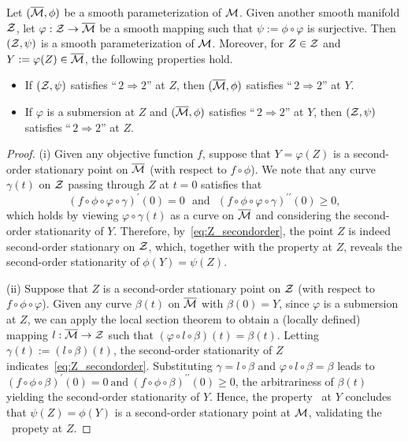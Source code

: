 \begin{proposition}\label{pro:composition}
    Let $(\overline{\mathcal{M}},\phi)$ be a smooth parameterization of $\mathcal{M}$. Given another smooth manifold $\mathcal{Z}$, let $\varphi:\mathcal{Z}\to\overline{\mathcal{M}}$ be a smooth mapping such that $\psi:=\phi\circ\varphi$ is surjective. Then $(\mathcal{Z},\psi)$ is a smooth parameterization of $\mathcal{M}$. Moreover, for $Z\in\mathcal{Z}$ and $Y:=\varphi(Z)\in\overline{\mathcal{M}}$, the following properties hold.
    \begin{itemize}
        \item [\emph{(i)}] If $(\mathcal{Z},\psi)$ satisfies ``\,$2\!\Rightarrow\!2$'' at $Z$, then $(\overline{\mathcal{M}},\phi)$ satisfies ``\,$2\!\Rightarrow\!2$'' at $Y$.
        \item [\emph{(ii)}] If $\varphi$ is a submersion at $Z$ and $(\overline{\mathcal{M}},\phi)$ satisfies ``\,$2\!\Rightarrow\!2$'' at $Y$, then $(\mathcal{Z},\psi)$ satisfies ``\,$2\!\Rightarrow\!2$'' at $Z$.
    \end{itemize}
\end{proposition}
\begin{proof}
    (i) Given any objective function $f$, suppose that $Y=\varphi(Z)$ is a second-order stationary point on $\overline{\mathcal{M}}$ (with respect to $f\circ\phi$). We note that any curve $\gamma(t)$ on $\mathcal{Z}$ passing through $Z$ at $t=0$ satisfies that
    \begin{equation}\label{eq:Z_secondorder}
        (f\circ\phi\circ\varphi\circ \gamma)^\prime(0)=0\ \ \ \text{and}\ \ \ (f\circ\phi\circ\varphi\circ \gamma)^{\prime\prime}(0)\ge 0,
    \end{equation}
    which holds by viewing $\varphi\circ \gamma(t)$ as a curve on $\overline{\mathcal{M}}$ and considering the second-order stationarity of $Y$. Therefore, by~\eqref{eq:Z_secondorder}, the point $Z$ is indeed second-order stationary on $\mathcal{Z}$, which, together with the \twototwo property at $Z$, reveals the second-order stationarity of $\phi(Y)=\psi(Z)$. 

    (ii) Suppose that $Z$ is a second-order stationary point on $\mathcal{Z}$ (with respect to $f\circ\phi\circ\varphi$). Given any curve $\beta(t)$ on $\overline{\mathcal{M}}$ with $\beta(0)=Y$, since $\varphi$ is a submersion at $Z$, we can apply the local section theorem \cite[Theorem 4.26]{lee2012manifolds} to obtain a (locally defined) mapping $l:\overline{\mathcal{M}}\to\mathcal{Z}$ such that $(\varphi\circ l\circ \beta)(t)=\beta(t)$. Letting $\gamma(t):= (l\circ \beta)(t)$, the second-order stationarity of $Z$ indicates~\eqref{eq:Z_secondorder}. Substituting $\gamma=l\circ \beta$ and $\varphi\circ l\circ \beta=\beta$ leads to $(f\circ\phi\circ\beta)^\prime(0)=0\ \text{and}\ (f\circ\phi\circ\beta)^{\prime\prime}(0)\ge 0$, the arbitrariness of $\beta(t)$ yielding the second-order stationarity of $Y$. Hence, the property \twototwo\ at $Y$ concludes that $\psi(Z)=\phi(Y)$ is a second-order stationary point at $\mathcal{M}$, validating the \twototwo\ propety at $Z$.
\end{proof}

